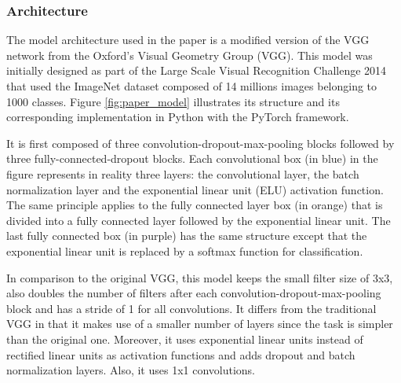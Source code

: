 \subsubsection{Architecture}
\setlength{\marginparwidth}{3cm}\leavevmode {}The model architecture used in the paper is a modified version of the VGG network from the Oxford's Visual Geometry Group (VGG). This model was initially designed as part of the Large Scale Visual Recognition Challenge 2014 that used the ImageNet dataset composed of 14 millions images belonging to 1000 classes. Figure \ref{fig:paper_model} illustrates its structure and its corresponding implementation in Python with the PyTorch framework.

It is first composed of three convolution-dropout-max-pooling blocks followed by three fully-connected-dropout blocks. Each convolutional box (in blue) in the figure represents in reality three layers: the convolutional layer, the batch normalization layer and the exponential linear unit (ELU) activation function. The same principle applies to the fully connected layer box (in orange) that is divided into a fully connected layer followed by the exponential linear unit. The last fully connected box (in purple) has the same structure except that the exponential linear unit is replaced by a softmax function for classification.

In comparison to the original VGG, this model keeps the small filter size of 3x3, also doubles the number of filters after each convolution-dropout-max-pooling block and has a stride of 1 for all convolutions. It differs from the traditional VGG in that it makes use of a smaller number of layers since the task is simpler than the original one. Moreover, it uses exponential linear units instead of rectified linear units as activation functions and adds dropout and batch normalization layers. Also, it uses 1x1 convolutions. 

